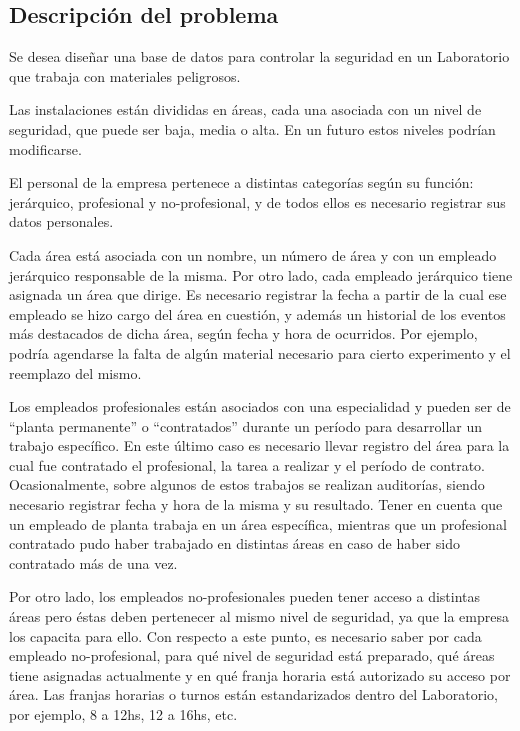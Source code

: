 \subsection{Descripción del problema}

Se desea diseñar una base de datos para controlar la seguridad en un Laboratorio que trabaja con
materiales peligrosos.

Las instalaciones están divididas en áreas, cada una asociada con un nivel de seguridad, que
puede ser baja, media o alta. En un futuro estos niveles podrían modificarse.

El personal de la empresa pertenece a distintas categorías según su función: jerárquico,
profesional y no-profesional, y de todos ellos es necesario registrar sus datos personales.

Cada área está asociada con un nombre, un número de área y con un empleado jerárquico
responsable de la misma. Por otro lado, cada empleado jerárquico tiene asignada un área que
dirige. Es necesario registrar la fecha a partir de la cual ese empleado se hizo cargo del área en
cuestión, y además un historial de los eventos más destacados de dicha área, según fecha y hora
de ocurridos. Por ejemplo, podría agendarse la falta de algún material necesario para cierto
experimento y el reemplazo del mismo.

Los empleados profesionales están asociados con una especialidad y pueden ser de ``planta
permanente'' o ``contratados'' durante un período para desarrollar un trabajo específico. En este
último caso es necesario llevar registro del área para la cual fue contratado el profesional, la tarea
a realizar y el período de contrato. Ocasionalmente, sobre algunos de estos trabajos se realizan
auditorías, siendo necesario registrar fecha y hora de la misma y su resultado. Tener en cuenta que
un empleado de planta trabaja en un área específica, mientras que un profesional contratado pudo
haber trabajado en distintas áreas en caso de haber sido contratado más de una vez.

Por otro lado, los empleados no-profesionales pueden tener acceso a distintas áreas pero éstas
deben pertenecer al mismo nivel de seguridad, ya que la empresa los capacita para ello. Con
respecto a este punto, es necesario saber por cada empleado no-profesional, para qué nivel de
seguridad está preparado, qué áreas tiene asignadas actualmente y en qué franja horaria está
autorizado su acceso por área. Las franjas horarias o turnos están estandarizados dentro del
Laboratorio, por ejemplo, 8 a 12hs, 12 a 16hs, etc.

